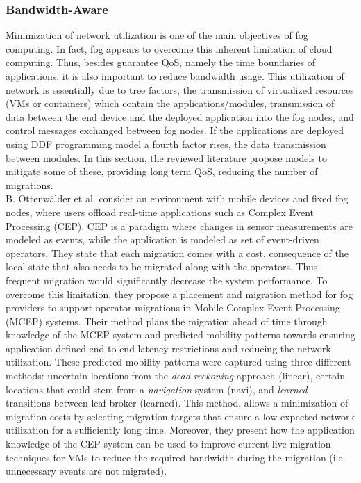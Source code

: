 \subsubsection{Bandwidth-Aware}\label{BandwidthAware}
\noindent Minimization of network utilization is one of the main objectives of fog computing. In fact, fog appears to overcome this inherent limitation of cloud computing. Thus, besides guarantee QoS, namely the time boundaries of applications, it is also  important to reduce bandwidth usage. This utilization of network is essentially due to tree factors, the transmission of virtualized resources (VMs or containers) which contain the applications/modules, transmission of data between the end device and the deployed application into the fog nodes, and control messages exchanged between fog nodes. If the applications are deployed using DDF programming model a fourth factor rises, the data transmission between modules. In this section, the reviewed literature propose models to mitigate some of these, providing long term QoS, reducing the number of migrations.\\
\noindent\tab B. Ottenwälder et al. \cite{ottenwalder2013migcep} consider an environment with mobile devices and fixed fog nodes, where users offload real-time applications such as Complex Event Processing (CEP). CEP is a paradigm where changes in sensor measurements are modeled as events, while the application is modeled as set of event-driven operators. They state that each migration comes with a cost, consequence of the local state that also needs to be migrated along with the operators. Thus, frequent migration would significantly decrease the system performance. To overcome this limitation, they propose a placement and migration method for fog providers to support operator migrations in Mobile Complex Event Processing (MCEP) systems. Their method plans the migration ahead of time through knowledge of the MCEP system and predicted mobility patterns towards ensuring application-defined end-to-end latency restrictions and reducing the network utilization. These predicted mobility patterns were captured using three different methods: uncertain locations from the \textit{dead reckoning} approach (linear), certain locations that could stem from a \textit{navigation} system (navi), and \textit{learned} transitions between leaf broker (learned). This method, allows a minimization of migration costs by selecting migration targets that ensure a low expected network utilization for a sufficiently long time. Moreover, they present how the application knowledge of the CEP system can be used to improve current live migration techniques for VMs to reduce the required bandwidth during the migration (i.e. unnecessary events are not migrated). \\
